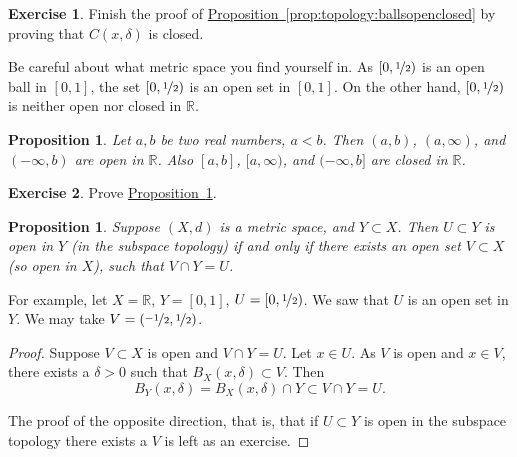 \documentclass[12pt,openany]{book}
\newcommand{\R}{{\mathbb{R}}}
\theoremstyle{plain}
\newtheorem{prop}[thm]{Proposition}
\theoremstyle{remark}
\theoremstyle{definition}
\newenvironment{exbox}{%
    \def\FrameCommand{\vrule width 1pt \relax\hspace{10pt}}%
    \MakeFramed{\advance\hsize-\width\FrameRestore}%
}{%
    \endMakeFramed
}
\theoremstyle{exercise}
\newtheorem{exercise}{Exercise}[section]
\theoremstyle{example}
\newcommand{\propref}[1]{\hyperref[#1]{Proposition~\ref*{#1}}}
\begin{document}
\begin{exbox}
\begin{exercise}
Finish the proof of \propref{prop:topology:ballsopenclosed} by
proving that $C(x,\delta)$ is closed.
\end{exercise}
\end{exbox}

Be careful about what metric space you find yourself in.
As $[0,\nicefrac{1}{2})$ is
an open ball in $[0,1]$, the set $[0,\nicefrac{1}{2})$ is
an open set in $[0,1]$.  On the other hand, $[0,\nicefrac{1}{2})$
is neither open nor closed in $\R$.

\begin{prop} \label{prop:topology:intervals:openclosed}
Let $a,b$ be two real numbers, $a < b$.  Then $(a,b)$, $(a,\infty)$,
and $(-\infty,b)$ are open in $\R$.
Also $[a,b]$, $[a,\infty)$,
and $(-\infty,b]$ are closed in $\R$.
\end{prop}


\begin{exbox}
\begin{exercise}
Prove \propref{prop:topology:intervals:openclosed}.
\end{exercise}
\end{exbox}

\begin{prop} \label{prop:topology:subspaceopen}
Suppose $(X,d)$ is a metric space, and $Y \subset X$.  Then $U \subset Y$
is open in $Y$ (in the subspace topology) if and only if
there exists an open set $V \subset X$ (so open in $X$), such that
$V \cap Y = U$.
\end{prop}

For example, let $X = \R$, $Y=[0,1]$, $U = [0,\nicefrac{1}{2})$.
We saw that $U$ is an open set in $Y$.
We may take $V = (\nicefrac{-1}{2},\nicefrac{1}{2})$.

\begin{proof}
Suppose $V \subset X$ is open and
$V \cap Y = U$.
Let $x \in U$.
As $V$ is open and $x \in V$, there
exists a $\delta > 0$ such that $B_X(x,\delta) \subset V$.
Then
\begin{equation*}
B_Y(x,\delta) = B_X(x,\delta) \cap Y \subset V \cap Y = U .
\end{equation*}

The proof of the opposite direction, that is, that if $U \subset Y$
is open in the subspace topology there exists a $V$ is left as
an exercise.
\end{proof}
\end{document}
